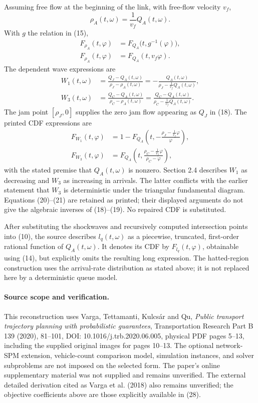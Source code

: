 \documentclass{article}
\begin{document}
Assuming free flow at the beginning of the link, with free-flow velocity \(v_f\),
\begin{equation}
\rho_A(t,\omega)=\frac{1}{v_f}Q_A(t,\omega).
\tag{15}
\end{equation}
With \(g\) the relation in (15),
\begin{align}
F_{\rho_A}(t,\varphi)&=F_{Q_A}\bigl(t,g^{-1}(\varphi)\bigr), \tag{16}\\
F_{\rho_A}(t,\varphi)&=F_{Q_A}(t,v_f\varphi). \tag{17}
\end{align}
The dependent wave expressions are
\begin{align}
W_1(t,\omega)
&=\frac{Q_J-Q_A(t,\omega)}{\rho_J-\rho_A(t,\omega)}
=-\frac{Q_A(t,\omega)}{\rho_J-\frac{1}{v_f}Q_A(t,\omega)}, \tag{18}\\
W_3(t,\omega)
&=\frac{Q_C-Q_A(t,\omega)}{\rho_C-\rho_A(t,\omega)}
=\frac{Q_C-Q_A(t,\omega)}{\rho_C-\frac{1}{v_f}Q_A(t,\omega)}. \tag{19}
\end{align}
The jam point \([\rho_J,0]\) supplies the zero jam flow appearing as \(Q_J\) in (18). The printed CDF expressions are
\begin{align}
F_{W_1}(t,\varphi)
&=1-F_{Q_A}\left(t,-\frac{\rho_J-\frac{1}{v_f}\varphi}{\varphi}\right), \tag{20}\\
F_{W_3}(t,\varphi)
&=F_{Q_A}\left(t,\frac{\rho_C-\frac{1}{v_f}\varphi}{\rho_C-\varphi}\right), \tag{21}
\end{align}
with the stated premise that \(Q_A(t,\omega)\) is nonzero. Section 2.4 describes \(W_1\) as decreasing and \(W_3\) as increasing in arrivals. The latter conflicts with the earlier statement that \(W_3\) is deterministic under the triangular fundamental diagram. Equations (20)--(21) are retained as printed; their displayed arguments do not give the algebraic inverses of (18)--(19). No repaired CDF is substituted.

After substituting the shockwaves and recursively computed intersection points into (10), the source describes \(l_q(t,\omega)\) as a piecewise, truncated, first-order rational function of \(Q_A(t,\omega)\). It denotes its CDF by \(F_{l_q}(t,\varphi)\), obtainable using (14), but explicitly omits the resulting long expression. The hatted-region construction uses the arrival-rate distribution as stated above; it is not replaced here by a deterministic queue model.

\paragraph{Source scope and verification.}
This reconstruction uses Varga, Tettamanti, Kulcs\'ar and Qu, \emph{Public transport trajectory planning with probabilistic guarantees}, Transportation Research Part B 139 (2020), 81--101, DOI: 10.1016/j.trb.2020.06.005, physical PDF pages 5--13, including the supplied original images for pages 10--13. The optional network-SPM extension, vehicle-count comparison model, simulation instances, and solver subproblems are not imposed on the selected form. The paper's online supplementary material was not supplied and remains unverified. The external detailed derivation cited as Varga et al. (2018) also remains unverified; the objective coefficients above are those explicitly available in (28).
\end{document}

